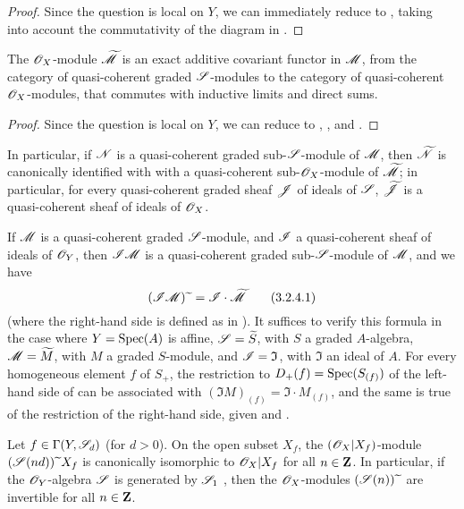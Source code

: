 \begin{proof}
Since the question is local on $Y$, we can immediately reduce to , taking into account the commutativity of the diagram in .
\end{proof}

\begin{proposition}[3.2.4]
\label{II.3.2.4}
The $\mathscr{O}_X$-module $\widetilde{\mathscr{M}}$ is an exact additive covariant functor in $\mathscr{M}$, from the category of quasi-coherent graded $\mathscr{S}$-modules to the category of quasi-coherent $\mathscr{O}_X$-modules, that commutes with inductive limits and direct sums.
\end{proposition}

\begin{proof}
Since the question is local on $Y$, we can reduce to , , and .
\end{proof}

In particular, if $\mathscr{N}$ is a quasi-coherent graded sub-$\mathscr{S}$-module of $\mathscr{M}$, then $\widetilde{\mathscr{N}}$ is canonically identified with with a quasi-coherent sub-$\mathscr{O}_X$-module of $\widetilde{\mathscr{M}}$;
in particular, for every quasi-coherent graded sheaf $\mathscr{J}$ of ideals of $\mathscr{S}$, $\widetilde{\mathscr{J}}$ is a quasi-coherent sheaf of ideals of $\mathscr{O}_X$.

If $\mathscr{M}$ is a quasi-coherent graded $\mathscr{S}$-module, and $\mathscr{I}$ a quasi-coherent sheaf of ideals of $\mathscr{O}_Y$, then $\mathscr{I}\mathscr{M}$ is a quasi-coherent graded sub-$\mathscr{S}$-module of $\mathscr{M}$, and we have
\[
\label{II.3.2.4.1}
  (\mathscr{I}\mathscr{M}){\,\widetilde{\,}\,} = \mathscr{I}\cdot\widetilde{\mathscr{M}}
\tag{3.2.4.1}
\]
(where the right-hand side is defined as in ).
It suffices to verify this formula in the case where $Y=\operatorname{Spec}(A)$ is affine, $\mathscr{S}=\widetilde{S}$, with $S$ a graded $A$-algebra, $\mathscr{M}=\widetilde{M}$, with $M$ a graded $S$-module, and $\mathscr{I}=\mathfrak{I}$, with $\mathfrak{I}$ an ideal of $A$.
For every homogeneous element $f$ of $S_+$, the restriction to $D_+(f)=\operatorname{Spec}(S_{(f)})$ of the left-hand side of  can be associated with $(\mathfrak{I}M)_{(f)}=\mathfrak{I}\cdot M_{(f)}$, and the same is true of the restriction of the right-hand side, given  and .

\begin{proposition}[3.2.5]
\label{II.3.2.5}
Let $f\in\Gamma(Y,\mathscr{S}_d)$ (for $d>0$).
On the open subset $X_f$, the $(\mathscr{O}_X|X_f)$-module $(\mathscr{S}(nd)){\,\widetilde{\,}\,} X_f$ is canonically isomorphic to $\mathscr{O}_X|X_f$ for all $n\in\mathbf{Z}$.
In particular, if the $\mathscr{O}_Y$-algebra $\mathscr{S}$ is generated by $\mathscr{S}_1$ , then the $\mathscr{O}_X$-modules $(\mathscr{S}(n)){\,\widetilde{\,}\,}$ are invertible for all $n\in\mathbf{Z}$.
\end{proposition}

